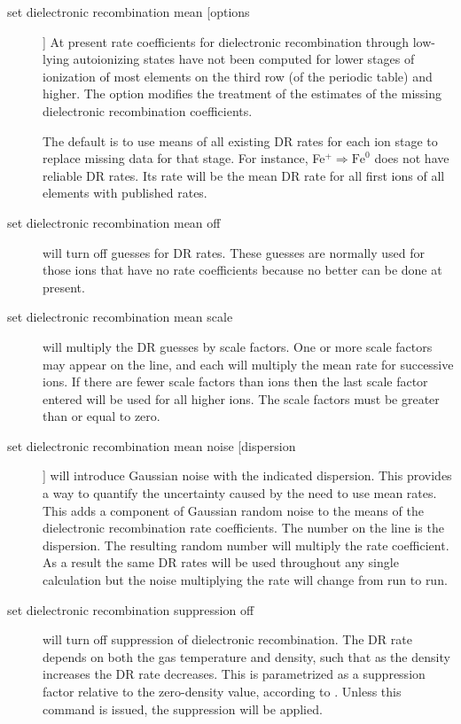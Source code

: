 \begin{description}
\item[set dielectronic recombination mean [options]]
At present rate
coefficients for dielectronic recombination through low-lying autoionizing
states have not been computed for lower stages of ionization of most
elements on the third row (of the periodic table) and higher.
The  option modifies the treatment
of the estimates of the missing dielectronic recombination coefficients.

The default is to use means of all existing DR rates for each ion stage
to replace missing data for that stage.
For instance, Fe$^+ \Rightarrow \mathrm{Fe}^0$ does not
have reliable DR rates.
Its rate will be the mean DR rate for all first
ions of all elements with published rates.

\item[set dielectronic recombination mean off]
will turn off guesses for DR rates.
These guesses are normally used for those ions that
have no rate coefficients because no better can be done at present.

\item[set dielectronic recombination mean scale]
will multiply the DR guesses by scale factors.
One or more scale factors may appear on the line, and each will
multiply the mean rate for successive ions.
If there are fewer scale factors than ions then the last
scale factor entered will be used for all higher ions.
The scale factors must be greater than or equal to zero.

\item[set dielectronic recombination mean noise [dispersion]]
will introduce Gaussian noise with the indicated dispersion.
This provides
a way to quantify the uncertainty caused by the need to use mean rates.
This adds a component of Gaussian random noise to the means of the
dielectronic recombination rate coefficients.
The number on the line is the dispersion.
The resulting random number will multiply the rate coefficient.
As a result the same DR rates will be used throughout
any single calculation but the noise multiplying the rate will change from
run to run.

\item[set dielectronic recombination suppression off]
will turn off suppression of dielectronic recombination.
The DR rate depends on both the gas temperature and density,
such that as the density increases the DR rate decreases.
This is parametrized as a suppression factor relative to the
zero-density value, according to \citet{Badnell2013-DRsuppression}.
Unless this command is issued, the suppression will be applied.
\end{description}

